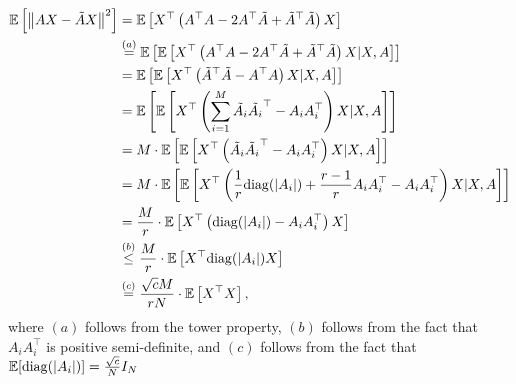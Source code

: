 \documentclass[twoside,11pt]{article}
\renewenvironment{proof}{\par\noindent{\bf Proof\ }}{\hfill\BlackBox\\[2mm]}
\newenvironment{proof}{\par\noindent{\bf Proof\ }}{\hfill\BlackBox\\[2mm]}
\def\E{\mathbb{E}}
\begin{document}
\begin{proof}
    \begin{align*}
        \E\left[\left\|AX - \tilde{A}X\right\|^2\right]
        & = \E\left[X^\top \left(A^\top A - 2A^\top \tilde{A} + \tilde{A}^\top \tilde{A}\right)X\right]\\
        & \overset{(a)}{=} \E\left[\E\left[X^\top \left(A^\top A - 2A^\top \tilde{A} + \tilde{A}^\top \tilde{A}\right)X|X, A\right]\right]\\
        & = \E\left[\E\left[X^\top\left(\tilde{A}^\top\tilde{A} - A^\top A\right) X|X, A\right]\right]\\
        & = \E\left[\E\left[X^\top\left(\sum_{i=1}^{M}\tilde{A_i}\tilde{A_i}^\top - A_i A_i^\top \right) X|X, A\right]\right]\\
        & = M \cdot \E\left[\E\left[X^\top\left(\tilde{A_i}\tilde{A_i}^\top - A_i A_i^\top \right) X|X, A\right]\right]\\
        & = M \cdot \E\left[\E\left[X^\top\left(\frac{1}{r}{\rm diag}(|A_i|) + \frac{r-1}{r}A_iA_i^\top - A_i A_i^\top \right) X|X, A\right]\right]\\
        & = \frac{M}{r} \cdot \E\left[X^\top\left({\rm diag}(|A_i|) - A_iA_i^\top\right) X\right]\\
        & \overset{(b)}{\leq} \frac{M}{r} \cdot \E\left[X^\top{\rm diag}(|A_i|) X\right]\\
        & \overset{(c)}{=}\frac{\sqrt{c}M}{rN}\cdot\E\left[X^\top X\right],
    \end{align*}
    where $(a)$ follows from the tower property, $(b)$ follows from the fact that $A_iA_i^\top$ is positive semi-definite, and $(c)$ follows from the fact that $\E[{\rm diag}(|A_i|)] = \frac{\sqrt{c}}{N}I_N$
    
\end{proof}
\end{document}
